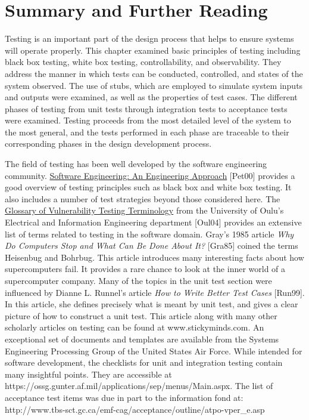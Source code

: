 \section{Summary and Further Reading}
\label{section:testingSummary-and-further-reading}

Testing is an important part of the design process that helps to ensure
systems will operate properly. This chapter examined basic principles of
testing including black box testing, white box testing, controllability,
and observability. They address the manner in which tests can be
conducted, controlled, and states of the system observed. The use of
stubs, which are employed to simulate system inputs and outputs were
examined, as well as the properties of test cases. The different phases
of testing from unit tests through integration tests to acceptance tests
were examined. Testing proceeds from the most detailed level of the
system to the most general, and the tests performed in each phase are
traceable to their corresponding phases in the design development
process.

The field of testing has been well developed by the software engineering
community. \ul{Software Engineering: An Engineering Approach}
{[}Pet00{]} provides a good overview of testing principles such as black
box and white box testing. It also includes a number of test strategies
beyond those considered here. The \ul{Glossary of Vulnerability Testing
Terminology} from the University of Oulu's Electrical and Information
Engineering department {[}Oul04{]} provides an extensive list of terms
related to testing in the software domain. Gray's 1985 article \emph{Why
Do Computers Stop and What Can Be Done About It?} {[}Gra85{]} coined the
terms Heisenbug and Bohrbug. This article introduces many interesting
facts about how supercomputers fail. It provides a rare chance to look
at the inner world of a supercomputer company. Many of the topics in the
unit test section were influenced by Dianne L. Runnel's article
\emph{How to Write Better Test Cases} {[}Run99{]}. In this article, she
defines precisely what is meant by unit test, and gives a clear picture
of how to construct a unit test. This article along with many other
scholarly articles on testing can be found at www.stickyminds.com. An
exceptional set of documents and templates are available from the
Systems Engineering Processing Group of the United States Air Force.
While intended for software development, the checklists for unit and
integration testing contain many insightful points. They are accessible
at https://ossg.gunter.af.mil/applications/sep/menus/Main.aspx. The list of
acceptance test items was due in part to the information fond at:\\
http://www.tbs-sct.gc.ca/emf-cag/acceptance/outline/atpo-vper\_e.asp
